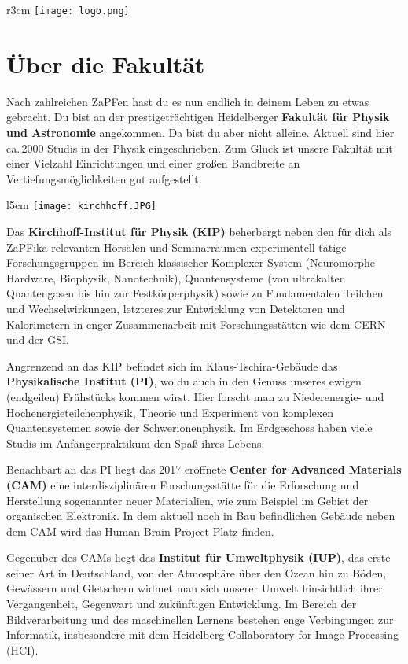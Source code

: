 
\begin{wrapfigure}{r}{3cm}
\texttt{[image: logo.png]}
\end{wrapfigure}

\section{Über die Fakultät}

Nach zahlreichen ZaPFen hast du es nun endlich in deinem Leben zu etwas gebracht. Du bist an der prestigeträchtigen Heidelberger \textbf{Fakultät für Physik und Astronomie} angekommen. Da bist du aber nicht alleine. Aktuell sind hier ca.\,2000 Studis in der Physik eingeschrieben. Zum Glück ist unsere Fakultät mit einer Vielzahl Einrichtungen und einer großen Bandbreite an Vertiefungsmöglichkeiten gut aufgestellt.

\begin{wrapfigure}{l}{5cm}
\texttt{[image: kirchhoff.JPG]}
\end{wrapfigure}

Das \textbf{Kirchhoff-Institut für Physik (KIP)} beherbergt neben den für dich als ZaPFika relevanten Hörsälen und Seminarräumen experimentell tätige Forschungsgruppen im Bereich klassischer Komplexer System (Neuromorphe Hardware, Biophysik, Nanotechnik), Quantensysteme (von ultrakalten Quantengasen bis hin zur Festkörperphysik) sowie zu Fundamentalen Teilchen und Wechselwirkungen, letzteres zur Entwicklung von Detektoren und Kalorimetern in enger Zusammenarbeit mit Forschungsstätten wie dem CERN und der GSI.

Angrenzend an das KIP befindet sich im Klaus-Tschira-Gebäude das \textbf{Physikalische Institut (PI)}, wo du auch in den Genuss unseres ewigen (endgeilen) Frühstücks kommen wirst. Hier forscht man zu Niederenergie- und Hochenergieteilchenphysik, Theorie und Experiment von komplexen Quantensystemen sowie der Schwerionenphysik. Im Erdgeschoss haben viele Studis im Anfängerpraktikum den Spaß ihres Lebens.

Benachbart an das PI liegt das 2017 eröffnete \textbf{Center for Advanced Materials (CAM)} eine interdisziplinären Forschungsstätte für die Erforschung und Herstellung sogenannter neuer Materialien, wie zum Beispiel im Gebiet der organischen Elektronik.
In dem aktuell noch in Bau befindlichen Gebäude neben dem CAM wird das Human Brain Project Platz finden. 

Gegenüber des CAMs liegt das \textbf{Institut für Umweltphysik (IUP)}, das erste seiner Art in Deutschland, von der Atmosphäre über den Ozean hin zu Böden, Gewässern und Gletschern widmet man sich unserer Umwelt hinsichtlich ihrer Vergangenheit, Gegenwart und zukünftigen Entwicklung. Im Bereich der Bildverarbeitung und des maschinellen Lernens bestehen enge Verbingungen zur Informatik, insbesondere mit dem Heidelberg Collaboratory for Image Processing (HCI).

